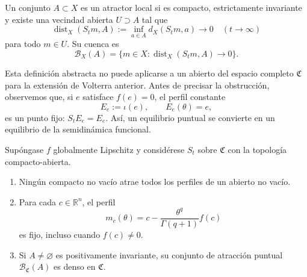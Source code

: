 \begin{definition}
Un conjunto \(A\subset X\) es un atractor local si es compacto, estrictamente
invariante y existe una vecindad abierta \(U\supset A\) tal que
\begin{equation}
 \operatorname{dist}_X(S_tm,A):=
 \inf_{a\in A}d_X(S_tm,a)\longrightarrow0
 \quad(t\to\infty)
 \label{eq:geofo-attraction}
\end{equation}
para todo \(m\in U\). Su cuenca es
\begin{equation}
 \mathcal B_X(A)=\{m\in X:
 \operatorname{dist}_X(S_tm,A)\to0\}.
 \label{eq:geofo-functional-basin}
\end{equation}
\end{definition}

Esta definición abstracta no puede aplicarse a un abierto del espacio completo
\(\mathfrak C\) para la extensión de Volterra anterior. Antes de precisar
la obstrucción, observemos que, si \(e\) satisface
\(f(e)=0\), el perfil constante
\begin{equation}
 E_e:=\iota(e),\qquad E_e(\theta)=e,
 \label{eq:geofo-equilibrium-profile}
\end{equation}
es un punto fijo: \(S_tE_e=E_e\). Así, un equilibrio puntual se convierte en
un equilibrio de la semidinámica funcional.

\begin{proposition}
\label{prop:geofo-full-space-obstruction}
Supóngase \(f\) globalmente Lipschitz y considérese \(S_t\) sobre
\(\mathfrak C\) con la topología compacto-abierta.
\begin{enumerate}
 \item Ningún compacto no vacío atrae todos los perfiles de un abierto no vacío.
 \item Para cada \(c\in\mathbb R^n\), el perfil
 \begin{equation}
  m_c(\theta)=c-\frac{\theta^q}{\Gamma(q+1)}f(c)
  \label{eq:geofo-artificial-fixed-profile}
 \end{equation}
 es fijo, incluso cuando \(f(c)\ne0\).
 \item Si \(A\ne\varnothing\) es positivamente invariante, su conjunto
 de atracción puntual \(\mathcal B_{\mathfrak C}(A)\) es denso en
 \(\mathfrak C\).
\end{enumerate}
\end{proposition}

